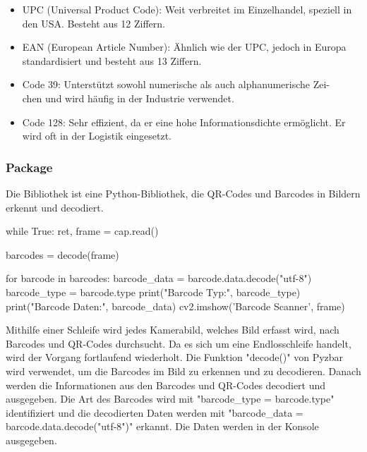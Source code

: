 \begin{itemize}
    \item UPC (Universal Product Code): Weit verbreitet im Einzelhandel, speziell in den USA. Besteht aus 12 Ziffern. \cite{Hompel:2007}
    \item EAN (European Article Number): Ähnlich wie der UPC, jedoch in Europa standardisiert und besteht aus 13 Ziffern. \cite{Hompel:2007}
    \item Code 39: Unterstützt sowohl numerische als auch alphanumerische Zei-\\chen und wird häufig in der Industrie verwendet. \cite{Hompel:2007}
    \item Code 128: Sehr effizient, da er eine hohe Informationsdichte ermöglicht. Er wird oft in der Logistik eingesetzt. \cite{Hompel:2007}
\end{itemize}

\subsubsection{Package }


Die Bibliothek  ist eine Python-Bibliothek, die QR-Codes und Barcodes in Bildern erkennt und decodiert. 


\bigskip

{

\begin{Python}
while True:
    ret, frame = cap.read()

barcodes = decode(frame)

for barcode in barcodes:
    barcode\_data = barcode.data.decode("utf-8")
    barcode\_type = barcode.type
    print("Barcode Typ:", barcode\_type)
    print("Barcode Daten:", barcode\_data)
    cv2.imshow('Barcode Scanner', frame)
\end{Python}
}

\bigskip

Mithilfe einer Schleife wird jedes Kamerabild, welches Bild erfasst wird, nach Barcodes und QR-Codes durchsucht. Da es sich um eine Endlosschleife handelt, wird der Vorgang fortlaufend wiederholt. Die Funktion "decode()" von Pyzbar wird verwendet, um die Barcodes im Bild zu erkennen und zu decodieren. Danach werden die Informationen aus den Barcodes und QR-Codes decodiert und ausgegeben. Die Art des Barcodes wird mit "barcode\_type = barcode.type" identifiziert und die decodierten Daten werden mit "barcode\_data = barcode.data.decode("utf-8")" erkannt. Die Daten werden in der Konsole ausgegeben.

